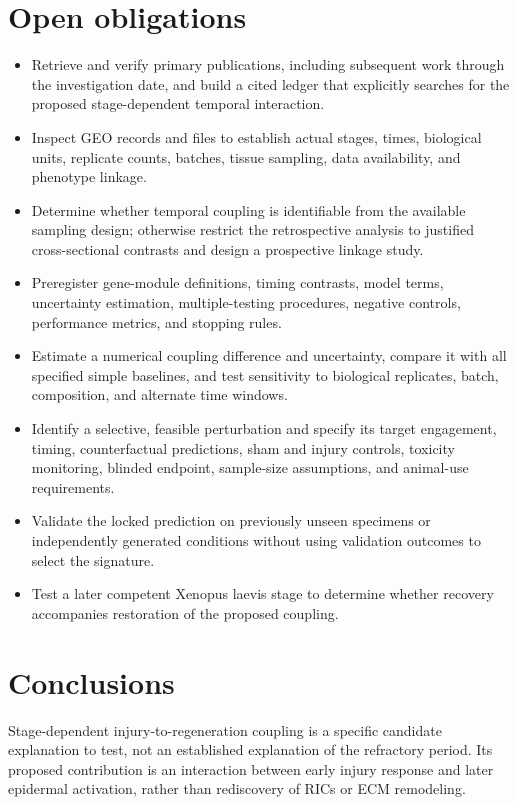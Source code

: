 \documentclass[11pt]{article}
\begin{document}
\section{Open obligations}
\begin{itemize}
\item Retrieve and verify primary publications, including subsequent work through the investigation date, and build a cited ledger that explicitly searches for the proposed stage-dependent temporal interaction.
\item Inspect GEO records and files to establish actual stages, times, biological units, replicate counts, batches, tissue sampling, data availability, and phenotype linkage.
\item Determine whether temporal coupling is identifiable from the available sampling design; otherwise restrict the retrospective analysis to justified cross-sectional contrasts and design a prospective linkage study.
\item Preregister gene-module definitions, timing contrasts, model terms, uncertainty estimation, multiple-testing procedures, negative controls, performance metrics, and stopping rules.
\item Estimate a numerical coupling difference and uncertainty, compare it with all specified simple baselines, and test sensitivity to biological replicates, batch, composition, and alternate time windows.
\item Identify a selective, feasible perturbation and specify its target engagement, timing, counterfactual predictions, sham and injury controls, toxicity monitoring, blinded endpoint, sample-size assumptions, and animal-use requirements.
\item Validate the locked prediction on previously unseen specimens or independently generated conditions without using validation outcomes to select the signature.
\item Test a later competent Xenopus laevis stage to determine whether recovery accompanies restoration of the proposed coupling.
\end{itemize}
\section{Conclusions}
Stage-dependent injury-to-regeneration coupling is a specific candidate explanation to test, not an established explanation of the refractory period. Its proposed contribution is an interaction between early injury response and later epidermal activation, rather than rediscovery of RICs or ECM remodeling.
\end{document}

